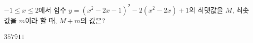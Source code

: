 $-1\le x\le 2$에서 함수 $y=(x^2-2x-1)^2-2(x^2-2x)+1$의 최댓값을 $M$, 최솟값을 $m$이라 할 때, $M+m$의 값은?
\begin{choices32}{$3$}{$5$}{$7$}{$9$}{$11$}\end{choices32}
